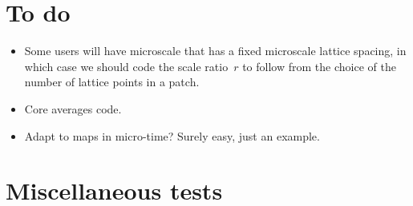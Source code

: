 


\begin{devMan}


\end{devMan}









\begin{devMan}

\section{To do}
\begin{itemize}
\item Some users will have microscale that has a fixed
microscale lattice spacing, in which case we should code the
scale ratio~\(r\) to follow from the choice of the number of
lattice points in a patch.
\item Core averages code.
\item Adapt to maps in micro-time?  Surely easy, just an example.
\end{itemize}


\section{Miscellaneous tests}




\end{devMan}
